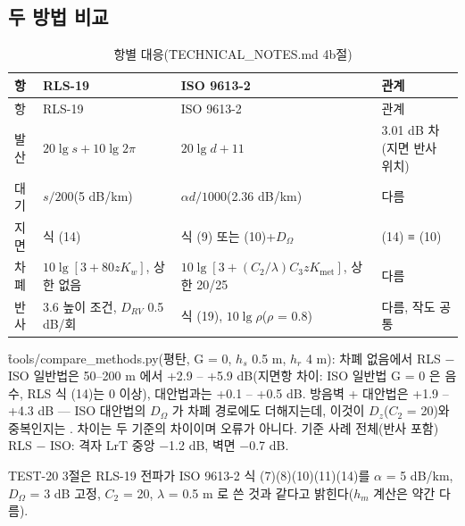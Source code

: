\documentclass[10.5pt,a4paper]{article}
\begin{document}
\subsection{두 방법 비교}
\begin{longtable}{P{18mm}P{50mm}P{50mm}P{30mm}}
\caption{항별 대응(\f{TECHNICAL\_NOTES.md} 4b절)}\label{tab:cmp}\\
\toprule 항 & RLS-19 & ISO 9613-2 & 관계 \\ \midrule\endfirsthead
\toprule 항 & RLS-19 & ISO 9613-2 & 관계 \\ \midrule\endhead
발산 & $20\lg s + 10\lg 2\pi$ & $20\lg d + 11$ & 3.01 dB 차(지면 반사 위치) \\
대기 & $s/200$(5 dB/km) & $\alpha d/1000$(2.36 dB/km) & 다름 \\
지면 & 식 (14) & 식 (9) 또는 (10)+$D_\Omega$ & (14) ≡ (10) \\
차폐 & $10\lg[3 + 80zK_w]$, 상한 없음 & $10\lg[3 + (C_2/\lambda)C_3zK_\mathrm{met}]$, 상한 20/25 & 다름 \\
반사 & 3.6 높이 조건, $D_{RV}$ 0.5 dB/회 & 식 (19), $10\lg\rho$($\rho$ = 0.8) & 다름, 작도 공통 \\
\bottomrule
\end{longtable}
\f{tools/compare\_methods.py}(평탄, G = 0, $h_s$ 0.5 m, $h_r$ 4 m): 차폐 없음에서 RLS − ISO 일반법은 50–200 m 에서 +2.9 – +5.9 dB(지면항 차이: ISO 일반법 G = 0 은 음수, RLS 식 (14)는 0 이상), 대안법과는 +0.1 – +0.5 dB. 방음벽 + 대안법은 +1.9 – +4.3 dB — ISO 대안법의 $D_\Omega$ 가 차폐 경로에도 더해지는데, 이것이 $D_z$($C_2$ = 20)와 중복인지는 \nob. 차이는 두 기준의 차이이며 오류가 아니다. 기준 사례 전체(반사 포함) RLS − ISO: 격자 LrT 중앙 −1.2 dB, 벽면 −0.7 dB.

TEST-20 3절은 RLS-19 전파가 ISO 9613-2 식 (7)(8)(10)(11)(14)를 $\alpha$ = 5 dB/km, $D_\Omega$ = 3 dB 고정, $C_2$ = 20, $\lambda$ = 0.5 m 로 쓴 것과 같다고 밝힌다($h_m$ 계산은 약간 다름).
\end{document}
